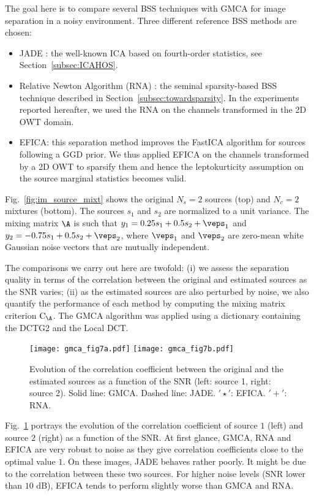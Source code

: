 The goal here is to compare several BSS techniques with GMCA for image separation in a noisy environment. Three different reference BSS methods are chosen:
\begin{itemize}
\item JADE \citep{ica:jade}: the well-known ICA based on fourth-order statistics, see Section~\ref{subsec:ICAHOS}.
\item Relative Newton Algorithm (RNA) \citep{ica:zibu_relnewton}: the seminal sparsity-based BSS technique described in Section~\ref{subsec:towardsparsity}. In the experiments reported hereafter, we used the RNA on the channels transformed in the 2D OWT domain.
\item EFICA: this separation method improves the FastICA algorithm for sources following a GGD prior. We thus applied EFICA on the channels transformed by a 2D OWT to sparsify them and hence the leptokurticity assumption on the source marginal statistics becomes valid. 
\end{itemize}

Fig.\ \ref{fig:im_source_mixt} shows the original $N_s=2$ sources (top) and $N_c=2$ mixtures (bottom). The sources $s_1$ and $s_2$ are normalized to a unit variance. The mixing matrix $\A$ is such that $y_1 = 0.25 s_1 + 0.5 s_2 + \veps_1$ and $y_2 = -0.75 s_1 + 0.5s_2 + \veps_2$, where $\veps_1$ and $\veps_2$ are zero-mean white Gaussian noise vectors that are mutually independent.

The comparisons we carry out here are twofold: (i) we assess the separation quality in terms of the correlation between the original and estimated sources as the SNR varies; (ii) as the estimated sources are also perturbed by noise, we also quantify the performance of each method by computing the mixing matrix criterion $\mathrm{C}_{\A}$. The GMCA algorithm was applied using a dictionary containing the DCTG2 and the Local DCT.  

\begin{figure}[htb]
\centerline{
\texttt{[image: gmca\_fig7a.pdf]}
\texttt{[image: gmca\_fig7b.pdf]}}
\caption{Evolution of the correlation coefficient between the original and the estimated sources as a function of the SNR (left: source 1, right: source 2). Solid line: GMCA. Dashed line: JADE. $'\star'$: EFICA. $'+'$: RNA.}  
\label{fig:crit_sources}
\end{figure}
Fig.\ \ref{fig:crit_sources} portrays the evolution of the correlation coefficient of source $1$ (left) and source $2$ (right) as a function of the SNR. At first glance, GMCA, RNA and EFICA are very robust to noise as they give correlation coefficients close to the optimal value $1$. On these images, JADE behaves rather poorly. It might be due to the correlation between these two sources. For higher noise levels (SNR lower than $10$ dB), EFICA tends to perform slightly worse than GMCA and RNA.


